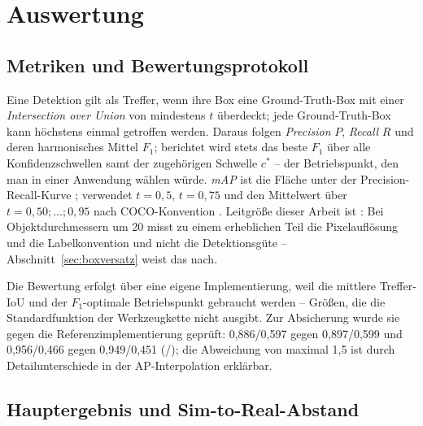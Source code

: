 \chapter{Auswertung}
\label{kap:auswertung}

\section{Metriken und Bewertungsprotokoll}
\label{sec:metriken}

Eine Detektion gilt als Treffer, wenn ihre Box eine Ground-Truth-Box mit einer
\emph{Intersection over Union} von mindestens $t$ überdeckt; jede
Ground-Truth-Box kann höchstens einmal getroffen werden. Daraus folgen
\emph{Precision} $P$, \emph{Recall} $R$ und deren harmonisches Mittel $F_1$;
berichtet wird stets das beste $F_1$ über alle Konfidenzschwellen samt der
zugehörigen Schwelle $c^*$ -- der Betriebspunkt, den man in einer Anwendung
wählen würde. \emph{mAP} ist die Fläche unter der Precision-Recall-Kurve
\parencite{everingham2010}; \mAPfifty{} verwendet $t = 0{,}5$, \mAPseven{}
$t = 0{,}75$ und \mAPall{} den Mittelwert über $t = 0{,}50; \dots; 0{,}95$ nach
COCO-Konvention \parencite{lin2014coco}. Leitgröße dieser Arbeit ist
\mAPfifty{}: Bei Objektdurchmessern um 20\px{} misst \mAPall{} zu einem
erheblichen Teil die Pixelauflösung und die Labelkonvention und nicht die
Detektionsgüte -- Abschnitt~\ref{sec:boxversatz} weist das nach.

Die Bewertung erfolgt über eine eigene Implementierung, weil die mittlere
Treffer-IoU und der $F_1$-optimale Betriebspunkt gebraucht werden -- Größen, die
die Standardfunktion der Werkzeugkette nicht ausgibt. Zur Absicherung wurde sie
gegen die Referenzimplementierung geprüft:  0,886/0,597 gegen
0,897/0,599 und  0,956/0,466 gegen 0,949/0,451
(\mAPfifty{}/\mAPall{}); die Abweichung von maximal 1,5\PP{} ist durch
Detailunterschiede in der AP-Interpolation erklärbar.

\section{Hauptergebnis und Sim-to-Real-Abstand}
\label{sec:hauptergebnis}

